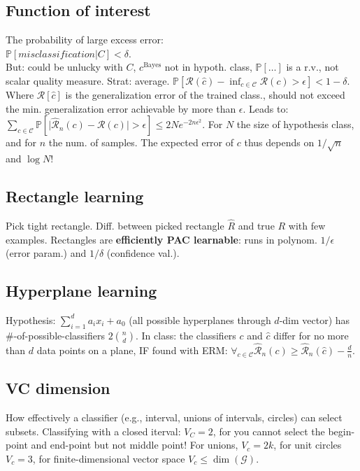 \subsection*{Function of interest}
The probability of large excess error:\\
$\mathbb{P}[misclassification|C]< \delta$.\\
But: could be unlucky with $C$, $c^\text{Bayes}$ not in hypoth. class, $\mathbb{P}[\dots]$ is a r.v., not scalar quality measure. Strat: average.
$\mathbb{P}[\mathcal{R}(\hat{c})-\inf_{c\in\mathcal{C}}\mathcal{R}(c)>\epsilon]<1-\delta$. Where $\mathcal{R}[\hat{c}]$ is the generalization error of the trained class., should not exceed the min. generalization error achievable by more than $\epsilon$.
Leads to:\\
$\sum_{c\in\mathcal{C}}\mathbb{P}[\lvert \hat{\mathcal{R}}_n(c)-\mathcal{R}(c)\rvert>\epsilon]\leq 2Ne^{-2n\epsilon^2}$. %
For $N$ the size of hypothesis class, and for $n$ the num. of samples. The expected error of $c$ thus depends on $1/\sqrt{n}$ and $\log N$!
\subsection*{Rectangle learning}
Pick tight rectangle. Diff. between picked rectangle $\hat{R}$ and true $R$ with few examples. Rectangles are \textbf{efficiently PAC learnable}: runs in polynom. $1/\epsilon$ (error param.) and $1/\delta$ (confidence val.).
\subsection*{Hyperplane learning}
Hypothesis: $\sum_{i=1}^d a_ix_i + a_0$ (all possible hyperplanes through $d$-dim vector) has \#-of-possible-classifiers $2\binom{n}{d}$. In class: the classifiers $c$ and $\hat{c}$ differ for no more than $d$ data points on a plane, IF found with ERM: $\forall_{c\in\mathcal{C}} \hat{\mathcal{R}}_n(c) \geq \hat{\mathcal{R}}_n(\hat{c}) - \frac{d}{n}$.
\subsection*{VC dimension}
How effectively a classifier (e.g., interval, unions of intervals, circles) can select subsets. Classifying with a closed iterval: $V_C=2$, for you cannot select the begin-point and end-point but not middle point! For unions, $V_c=2k$, for unit circles $V_c=3$, for finite-dimensional vector space $V_c\leq\dim(\mathcal{G})$.
